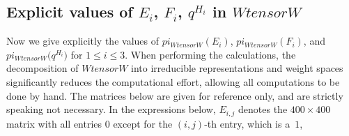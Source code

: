 \documentclass[10pt,a4paper]{amsart}
\numberwithin{equation}{section}
\theoremstyle{definition}
\def\boldsymbol#1{#1}
\def\pi{pi}
\def\otimes{ tensor }
\begin{document}
\subsection[Explicit values of E\_i, F\_i, q\^{}\{H\_i\} in W otimes W]{Explicit values of $\boldsymbol{E_i}$, $\boldsymbol{F_i}$, $\boldsymbol{q^{H_i}}$ in $\boldsymbol{W \otimes W}$}
\label{subsection--EiFiqHi}
Now we give explicitly the values of $\pi_{W \otimes W}(E_i)$, $\pi_{W \otimes W}(F_i)$, and $\pi_{W \otimes W}\bigl(q^{H_i}\bigr)$ for $1 \le i \le 3$. When performing the calculations, the decomposition of $W\otimes W$ into irreducible representations and weight spaces significantly reduces the computational effort, allowing all computations to be done by hand. The matrices below are given for reference only, and are strictly speaking not necessary. In the expressions below, $E_{i,j}$ denotes the $400 \times 400$ matrix with all entries $0$ except for the $(i,j)$-th entry, which is a~$1$,
\end{document}
